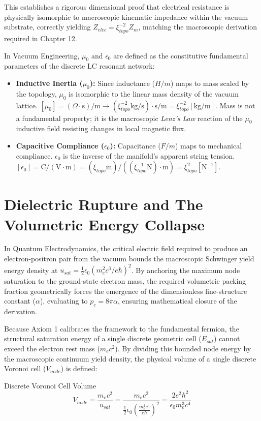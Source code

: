 This establishes a rigorous dimensional proof that electrical resistance is physically isomorphic
to macroscopic kinematic impedance within the vacuum substrate, correctly yielding $Z_{elec}=\xi_{topo}^{-2}Z_{m}$,
matching the macroscopic derivation required in Chapter 12.

In Vacuum Engineering, $\mu_{0}$ and $\epsilon_{0}$ are defined as the constitutive fundamental parameters of the discrete LC resonant network:

\begin{itemize}
\item \textbf{Inductive Inertia ($\mu_0$):} Since inductance ($H/m$) maps to mass scaled by the topology, $\mu_{0}$ is isomorphic to the linear mass density of the vacuum lattice. $[\mu_{0}] = (\Omega\cdot\text{s})/\text{m} \rightarrow (\xi_{topo}^{-2}\text{kg/s})\cdot\text{s/m} = \xi_{topo}^{-2}[\text{kg/m}]$. Mass is not a fundamental property; it is the macroscopic \textit{Lenz's Law} reaction of the $\mu_0$ inductive field resisting changes in local magnetic flux.
\item \textbf{Capacitive Compliance ($\epsilon_0$):} Capacitance ($F/m$) maps to mechanical compliance. $\epsilon_{0}$ is the inverse of the manifold's apparent string tension. $[\epsilon_{0}] = \text{C}/(\text{V}\cdot\text{m}) = (\xi_{topo}\text{m}) / ((\xi_{topo}^{-1}\text{N})\cdot\text{m}) = \xi_{topo}^2[\text{N}^{-1}]$.
\end{itemize}

\section{Dielectric Rupture and The Volumetric Energy Collapse}
In Quantum Electrodynamics, the critical electric field required to produce an electron-positron pair from the vacuum bounds the macroscopic Schwinger yield energy density at $u_{sat} = \frac{1}{2} \epsilon_0 (m_e^2 c^3 / e \hbar)^2$. By anchoring the maximum node saturation to the ground-state electron mass, the required volumetric packing fraction geometrically forces the emergence of the dimensionless fine-structure constant ($\alpha$), evaluating to $p_c = 8\pi\alpha$, ensuring mathematical closure of the derivation.

Because Axiom 1 calibrates the framework to the fundamental fermion, the structural saturation energy of a single discrete geometric cell ($E_{sat}$) cannot exceed the electron rest mass ($m_e c^2$). By dividing this bounded node energy by the macroscopic continuum yield density, the physical volume of a single discrete Voronoi cell ($V_{node}$) is defined:
\begin{resultbox}{Discrete Voronoi Cell Volume}
\begin{equation}
    V_{node} = \frac{m_e c^2}{u_{sat}} = \frac{m_e c^2}{\frac{1}{2} \epsilon_0 \left( \frac{m_e^2 c^3}{e \hbar} \right)^2} = \frac{2 e^2 \hbar^2}{\epsilon_0 m_e^3 c^4}
\end{equation}
\end{resultbox}

